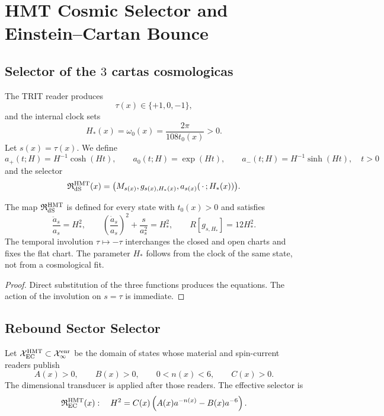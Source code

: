 \section{HMT Cosmic Selector and Einstein--Cartan Bounce}
\label{sec:hmtf2-selector-cosmologico}

\subsection{Selector of the \(3\) cartas cosmologicas}

The TRIT reader produces
\[
 \tau(x)\in\{+1,0,-1\},
\]
and the internal clock sets
\[
 H_*(x)=\omega_0(x)=\frac{2\pi}{108t_0(x)}>0.
\]
Let \(s(x)=\tau(x)\). We define
\[
 a_{+}(t;H)=H^{-1}\cosh(Ht),\qquad
 a_0(t;H)=\exp(Ht),\qquad
 a_{-}(t;H)=H^{-1}\sinh(Ht),\quad t>0
\]
and the selector
\[
 \mathfrak R_{\rm dS}^{\rm HMT}(x)
 =\bigl(M_{s(x)},g_{s(x),H_*(x)},a_{s(x)}(\,\cdot\,;H_*(x))\bigr).
\]

\begin{theorem}
\label{thm:hmtf2-selector-ds}
The map \(\mathfrak R_{\rm dS}^{\rm HMT}\) is defined for every state with \(t_0(x)>0\) and
satisfies
\[
 \frac{\ddot a_s}{a_s}=H_*^2,\qquad
 \left(\frac{\dot a_s}{a_s}\right)^2+\frac{s}{a_s^2}=H_*^2,
 \qquad
 R[g_{s,H_*}]=12H_*^2.
\]
The temporal involution \(\tau\mapsto-\tau\) interchanges the closed and
open charts and fixes the flat chart. The parameter \(H_*\) follows from the clock of the same
state, not from a cosmological fit.
\end{theorem}

\begin{proof}
Direct substitution of the three functions produces the equations. The
action of the involution on \(s=\tau\) is immediate.
\end{proof}

\subsection{Rebound Sector Selector}

Let \(\mathcal X_{\rm EC}^{\rm HMT}\subset\mathcal X_\infty^{\rm enr}\) be the
domain of states whose material and spin-current readers publish
\[
 A(x)>0,\qquad B(x)>0,\qquad 0<n(x)<6,\qquad C(x)>0.
\]
The dimensional transducer is applied after those readers. The effective selector is
\[
 \mathfrak R_{\rm EC}^{\rm HMT}(x):
 \quad
 H^2=C(x)\left(A(x)a^{-n(x)}-B(x)a^{-6}\right).
\]

